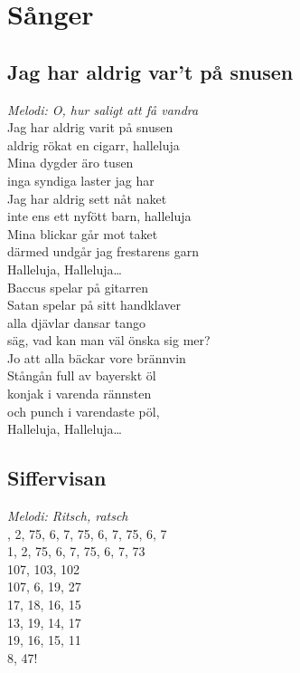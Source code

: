 \documentclass[a5paper]{article}
\begin{document}
	\newpage
	
	\section{Sånger}
	
	\subsection{Jag har aldrig var't på snusen}
		\textit{Melodi: O, hur saligt att få vandra} \\
		
		\noindent 
		Jag har aldrig varit på snusen \\ 
		aldrig rökat en cigarr, halleluja \\ 
		Mina dygder äro tusen \\ 
		inga syndiga laster jag har \\ 
		Jag har aldrig sett nåt naket \\ 
		inte ens ett nyfött barn, halleluja \\ 
		Mina blickar går mot taket \\ 
		därmed undgår jag frestarens garn \\ 
		
		\noindent
		Halleluja, Halleluja… \\ 
		
		\noindent
		Baccus spelar på gitarren \\ 
		Satan spelar på sitt handklaver \\ 
		alla djävlar dansar tango \\ 
		säg, vad kan man väl önska sig mer? \\ 	
		
		\noindent
		Jo att alla bäckar vore brännvin \\
		Stångån full av bayerskt öl \\
		konjak i varenda rännsten \\
		och punch i varendaste pöl, \\
	
		\noindent
		Halleluja, Halleluja…

	\subsection{Siffervisan}
		\textit{Melodi: Ritsch, ratsch} \\
		
		, 2, 75, 6, 7, 75, 6, 7, 75, 6, 7 \\
		1, 2, 75, 6, 7, 75, 6, 7, 73 \\
		107, 103, 102 \\
		107, 6, 19, 27 \\
		17, 18, 16, 15 \\
		13, 19, 14, 17 \\
		19, 16, 15, 11 \\
		8, 47! \\
		
\end{document}
